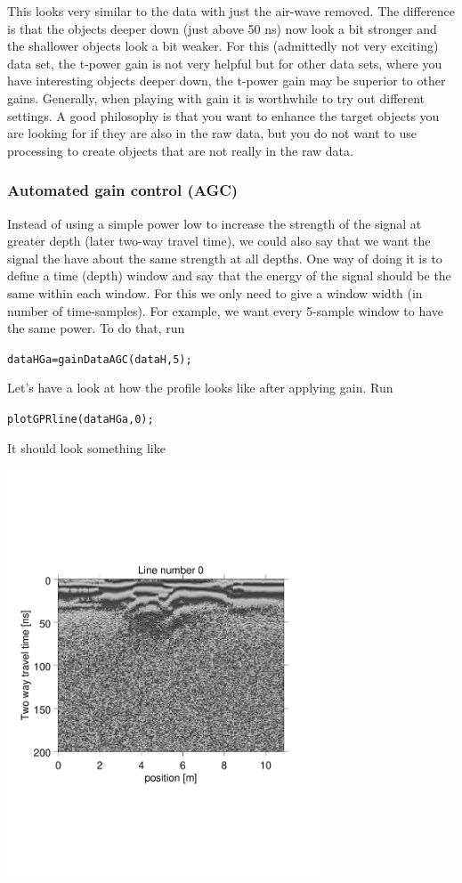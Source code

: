 \documentclass[11pt]{article}
\begin{document}
This looks very similar to the data with just the air-wave
removed. The difference is that the objects deeper down (just above 50
ns) now look a bit stronger and the shallower objects look a bit
weaker. For this (admittedly not very exciting) data set, the t-power
gain is not very helpful but for other data sets, where you have
interesting objects deeper down, the t-power gain may be superior to
other gains. Generally, when playing with gain it is worthwhile to try
out different settings. A good philosophy is that you want to enhance
the target objects you are looking for if they are also in the raw
data, but you do not want to use processing to create objects that are
not really in the raw data. 

\subsubsection{Automated gain control (AGC)}

Instead of using a simple power low to increase the strength of the
signal at greater depth (later two-way travel time), we could also say
that we want the signal the have about the same strength at all
depths. One way of doing it is to define a time (depth) window and say
that the energy of the signal should be the same within each
window. For this we only need to give a window width (in number of
time-samples). For example, we want every 5-sample window to have the
same power. To do that, run
 
\qquad \verb#dataHGa=gainDataAGC(dataH,5);#

Let's have a look at how the profile looks like after applying
gain. Run

\qquad \verb#plotGPRline(dataHGa,0);#

It should look something like
\begin{center}
\includegraphics[width=0.7\textwidth, trim = 0.9cm 6cm 2cm
  6.5cm,clip]{figures/GPRlineHGa0}
\end{center}
\end{document}
